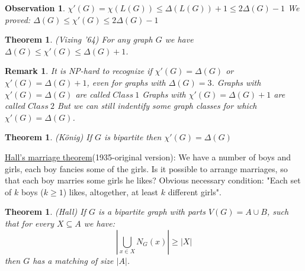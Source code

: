 \documentclass[a4paper]{article}
\theoremstyle{plain}
\newtheorem{theorem}[lemma]{Theorem}
\newtheorem{observation}[lemma]{Observation}
\theoremstyle{myremark}
\newtheorem{remark}[lemma]{Remark}
\begin{document}
{{{\begin {observation}
$\chi'(G)=\chi(L(G)) \leq \Delta(L(G))+1\leq 2\Delta(G)-1$
\newline
We proved: $\Delta(G)\leq \chi'(G) \leq 2\Delta(G)-1$
\end {observation}
\begin {theorem}
(Vizing '64) For any graph $G$ we have
$\Delta(G)\leq \chi'(G) \leq \Delta(G)+1$.
\end {theorem}
\begin {remark}
It is NP-hard to recognize if $\chi'(G)=\Delta(G)$ or $\chi'(G)=\Delta(G)+1$, even for graphs with $\Delta(G)=3$.
\newline
Graphs with $\chi'(G)=\Delta(G)$ are called $Class\ 1$
\newline
Graphs with $\chi'(G)=\Delta(G)+1$ are called $Class\ 2$
\newline
But we can still indentify some graph classes for which $\chi'(G)=\Delta(G)$.
\end {remark}
\begin {theorem}
(K\"onig) If $G$ is bipartite then $\chi'(G)=\Delta(G)$
\end {theorem}

\underline {Hall's marriage theorem}(1935-original version): We have a number of boys and girls, each boy fancies some of the girls. Is it possible to arrange marriages, so that each boy marries some girls he likes?
\newline
Obvious necessary condition: "Each set of $k$ boys ($k\geq 1$) likes, altogether, at least $k$ different girls".
\begin {theorem}
(Hall) If $G$ is a bipartite graph with parts $V(G)=A\cup B$, such that for every $X\subseteq A$ we have:
$$|\bigcup_{x\in X}N_G(x)|\geq |X|$$
then $G$ has a matching of size $|A|$.
\end {theorem}
\newpage
\begin {center}
\end{center}}}}
\end{document}
